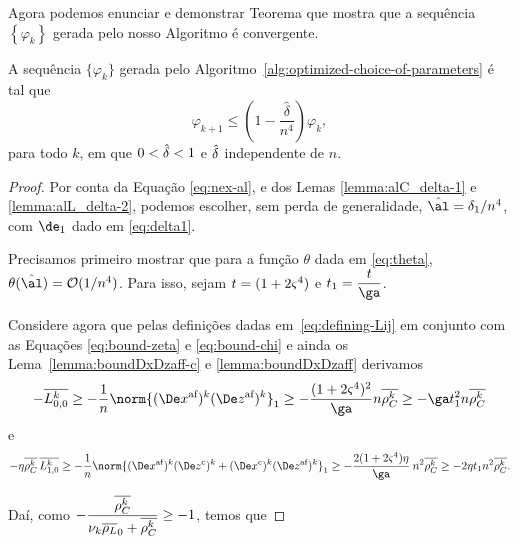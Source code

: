 Agora podemos enunciar e demonstrar  Teorema que mostra que a sequência $\left\{ \varphi_{k}\right\}$ gerada pelo nosso Algoritmo é convergente. 

\begin{teo}\label{teo:next-phi-delta-n4}
A sequência $\{\varphi_{k}\}$ gerada pelo Algoritmo~\ref{alg:optimized-choice-of-parameters} é tal que
\begin{equation}
		\label{eq:varphi-delta-n4}
				\varphi_{k+1}\leq \left(1 - \frac{\hat{\delta}}{n^{4}}\right)\varphi_{k},
	\end{equation}
	para todo $k$, em que $0<\hat{\delta}<1$ e $\hat{\delta}$ independente de $n$.
\end{teo}


\begin{proof} Por conta da Equação \eqref{eq:nex-al}, e dos Lemas \ref{lemma:alC_delta-1} e \ref{lemma:alL_delta-2}, podemos escolher, sem perda de generalidade, $\nextal = \delta_{1}/n^{4}$, com $\de_{1}$ dado em \eqref{eq:delta1}. 

Precisamos  primeiro mostrar que para a função $\theta$ dada em \eqref{eq:theta},  $\theta(\nextal)= \Oset(1/n^{4})$. Para isso, sejam $t = (1+2\varsigma^{4})$ e $t_1 = \dfrac{t}{\ga}$.  

Considere agora que pelas definições  dadas em~\eqref{eq:defining-Lij} em conjunto com  as Equações  \eqref{eq:bound-zeta} e \eqref{eq:bound-chi} e ainda  os Lema~\ref{lemma:boundDxDzaff-c} e \ref{lemma:boundDxDzaff} derivamos 
\[
- \dbvec{L_{0,0}^{k}} \geq - \dfrac{1}{n} \norm{ \dekx  \dekz }_1 \geq - \dfrac{(1 + 2\bdxzstar^{4})^{2} }{\ga} n\rhoCkb \geq -\ga t_{1}^{2}n\rhoCkb
\]
e 
\[
- \eta\rhoCkb\,  \dbvec{L_{1,0}^{k}} \geq - \dfrac{1}{n} \norm{ \dekx \Dekcoz + \Dekcox \dekz }_1 \geq - \dfrac{2(1+2\bdxzstar^{4})\eta }{\ga}\: n^{2}\rhoCkb\geq - 2\eta t_{1} n^{2}\rhoCkb.
\]




Daí, como $-\dfrac{\overline{\rho_C^{k}} }{\nu_{k} \overline{\rho_L}_0 + \overline{\rho_C^{k}} }\geq - 1$, temos que




\end{proof}
